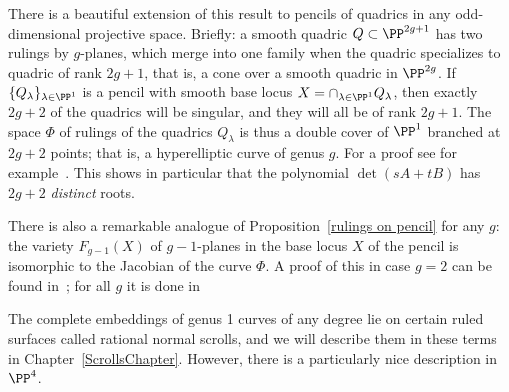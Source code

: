 \begin{fact}
 There is a beautiful extension of this result to pencils of quadrics in any odd-dimensional projective space. Briefly: a smooth quadric $Q \subset \PP^{2g+1}$ has two rulings by $g$-planes, which merge into one family when the quadric specializes to quadric of rank $2g+1$, that is, a cone over a smooth quadric in $\PP^{2g}$. If $\{Q_\lambda\}_{\lambda \in \PP^1}$ is a pencil with smooth base locus $X = \cap_{\lambda \in \PP^1} Q_\lambda$, then exactly $2g+2$ of the quadrics will be singular, and they will all be of rank $2g+1$. The space $\Phi$ of rulings of the quadrics $Q_\lambda$ is thus a double cover of $\PP^1$ branched at $2g+2$  points; that is, a hyperelliptic curve of genus $g$. For a proof see for example~\cite[Proposition 22.34]{Harris1995}.
 This shows in particular that the polynomial $\det(sA+tB)$ has $2g+2$ \emph{distinct} roots. 

 There is also a remarkable analogue of Proposition~\ref{rulings on pencil} for any $g$: the variety $F_{g-1}(X)$ of $g-1$-planes in the base locus $X$ of the pencil is isomorphic to the Jacobian of the  curve $\Phi$. A proof of this in case $g=2$ can be found in~\cite{Griffiths-Harris1978}; for all $g$ it is done in~\cite{Donagi}
\end{fact}

The complete embeddings of genus 1 curves of any degree lie on certain ruled surfaces called rational
normal scrolls, and we will describe them in these terms in Chapter~\ref{ScrollsChapter}. However, there is a particularly nice description in $\PP^4$. 

